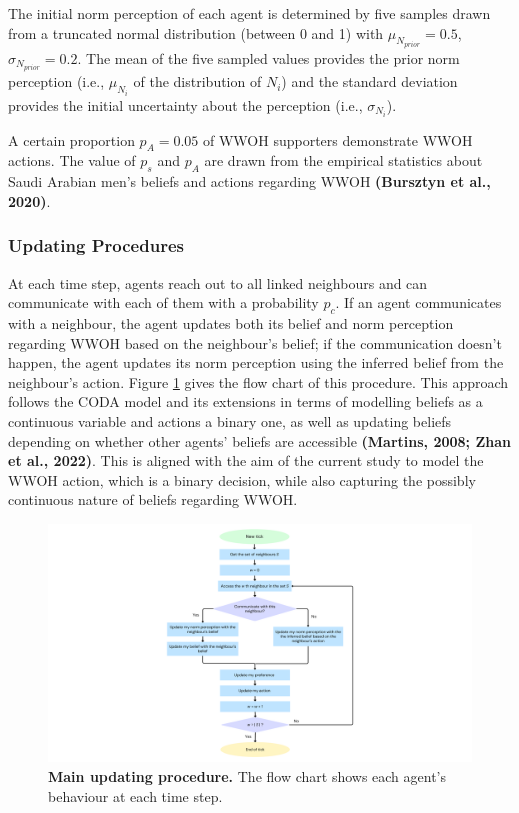 \documentclass[
  11pt,
]{article}
\begin{document}
The initial norm perception of each agent is determined by five samples
drawn from a truncated normal distribution (between 0 and 1) with
\(\mu_{N_{prior}} = 0.5\), \(\sigma_{N_{prior}} = 0.2\). The mean of the
five sampled values provides the prior norm perception (i.e.,
\(\mu_{N_i}\) of the distribution of \(N_i\)) and the standard deviation
provides the initial uncertainty about the perception (i.e.,
\(\sigma_{N_i}\)).

A certain proportion \(p_A = 0.05\) of WWOH supporters demonstrate WWOH
actions. The value of \(p_s\) and \(p_A\) are drawn from the empirical
statistics about Saudi Arabian men's beliefs and actions regarding WWOH
\textbf{(Bursztyn et al., 2020)}.

\hypertarget{updating-procedures}{%
\subsubsection{Updating Procedures}\label{updating-procedures}}

At each time step, agents reach out to all linked neighbours and can
communicate with each of them with a probability \(p_c\). If an agent
communicates with a neighbour, the agent updates both its belief and
norm perception regarding WWOH based on the neighbour's belief; if the
communication doesn't happen, the agent updates its norm perception
using the inferred belief from the neighbour's action. Figure
\ref{fig:1} gives the flow chart of this procedure. This approach
follows the CODA model and its extensions in terms of modelling beliefs
as a continuous variable and actions a binary one, as well as updating
beliefs depending on whether other agents' beliefs are accessible
\textbf{(Martins, 2008; Zhan et al., 2022)}. This is aligned with the
aim of the current study to model the WWOH action, which is a binary
decision, while also capturing the possibly continuous nature of beliefs
regarding WWOH.

\begin{figure}[h]
  \centering
  \includegraphics[width=0.8\columnwidth]{./figures/diss_flow_chart.pdf}
  \caption{\textbf{Main updating procedure.} The flow chart shows each agent's behaviour at each time step.}
  \label{fig:1}
\end{figure}
\end{document}
